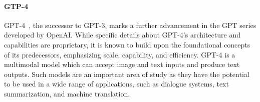 \paragraph{GTP-4}
\label{par:gpt-4}

GPT-4~\cite{openai2024gpt4}, the successor to GPT-3, marks a further advancement in the GPT series developed by OpenAI. While specific details about GPT-4's architecture and capabilities are proprietary, it is known to build upon the foundational concepts of its predecessors, emphasizing scale, capability, and efficiency.
GPT-4 is a multimodal model which can accept image and text inputs and produce text outputs.
Such models are an important area of study as they have the potential to be used in a wide range of applications, such as dialogue systems, text summarization, and machine translation.

